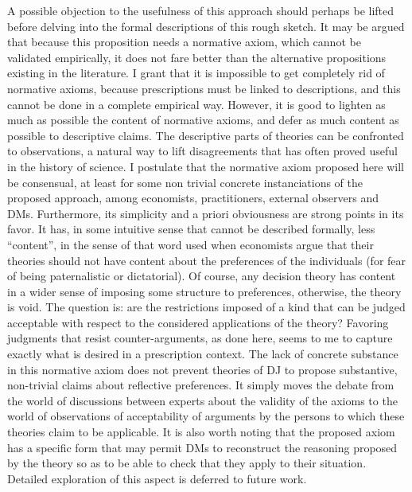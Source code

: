 \documentclass[version=last, pagesize, twoside=off, bibliography=totoc, DIV=calc, fontsize=12pt, a4paper, french, english]{scrartcl}
\begin{document}
A possible objection to the usefulness of this approach should perhaps be lifted before delving into the formal descriptions of this rough sketch.
It may be argued that because this proposition needs a normative axiom, which cannot be validated empirically, it does not fare better than the alternative propositions existing in the literature. 
I grant that it is impossible to get completely rid of normative axioms, because prescriptions must be linked to descriptions, and this cannot be done in a complete empirical way.
However, it is good to lighten as much as possible the content of normative axioms, and defer as much content as possible to descriptive claims. The descriptive parts of theories can be confronted to observations, a natural way to lift disagreements that has often proved useful in the history of science.
I postulate that the normative axiom proposed here will be consensual, at least for some non trivial concrete instanciations of the proposed approach, among economists, practitioners, external observers and \acp{DM}. Furthermore, its simplicity and a priori obviousness are strong points in its favor. It has, in some intuitive sense that cannot be described formally, less “content”, in the sense of that word used when economists argue that their theories should not have content about the preferences of the individuals (for fear of being paternalistic or dictatorial). Of course, any decision theory has content in a wider sense of imposing some structure to preferences, otherwise, the theory is void. The question is: are the restrictions imposed of a kind that can be judged acceptable with respect to the considered applications of the theory? Favoring judgments that resist counter-arguments, as done here, seems to me to capture exactly what is desired in a prescription context.
The lack of concrete substance in this normative axiom does not prevent theories of \ac{DJ} to propose substantive, non-trivial claims about reflective preferences. It simply moves the debate from the world of discussions between experts about the validity of the axioms to the world of observations of acceptability of arguments by the persons to which these theories claim to be applicable.
It is also worth noting that the proposed axiom has a specific form that may permit \acp{DM} to reconstruct the reasoning proposed by the theory so as to be able to check that they apply to their situation. Detailed exploration of this aspect is deferred to future work.
\end{document}
